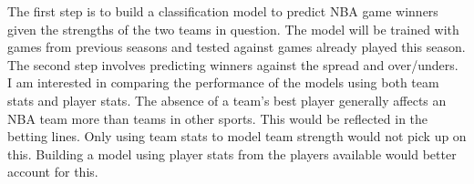 \documentclass{article}
\begin{document}
\bigbreak
The first step is to build a classification model to predict NBA game winners given the strengths of the two teams in question. The model will be trained with games from previous seasons and tested against games already played this season. The second step involves predicting winners against the spread and over/unders. I am interested in comparing the performance of the models using both team stats and player stats. The absence of a team's best player generally affects an NBA team more than teams in other sports. This would be reflected in the betting lines. Only using team stats to model team strength would not pick up on this. Building a model using player stats from the players available would better account for this.
\end{document}
